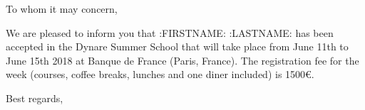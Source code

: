 \documentclass{letter}
\begin{document}
\begin{letter}{}
  
  \bigskip
  \bigskip
  \bigskip
  
\opening{To whom it may concern,}

\thispagestyle{fancy}

  \bigskip
  \bigskip
  \bigskip

We are pleased to inform you that :{FIRSTNAME}: :{LASTNAME}: has been accepted in the Dynare Summer School that will take place from June 11th to June 15th 2018 at Banque de France (Paris, France). The registration fee for the week (courses, coffee breaks, lunches and one diner included) is 1500€.

  \bigskip
  \bigskip
  \bigskip
  \bigskip
  \bigskip
  \bigskip
  \bigskip
  
\closing{Best regards,\\
 \\
}

\end{letter}
\end{document}
